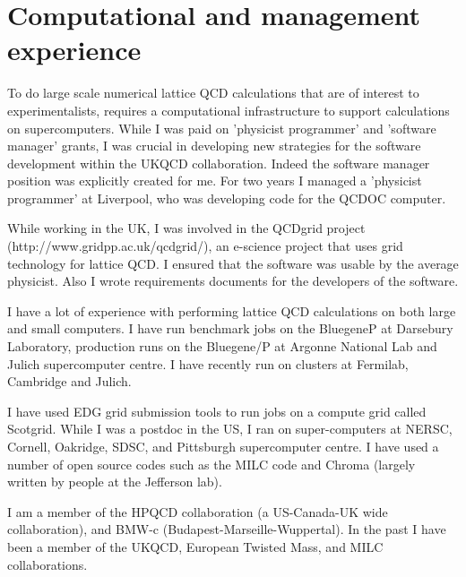 
\section{Computational and management experience}

To do large scale numerical lattice QCD calculations that are of
interest to experimentalists, requires a computational infrastructure
to support calculations on supercomputers.  While I was paid on
'physicist programmer' and 'software manager' grants, I was crucial in
developing new strategies for the software development within the 
UKQCD collaboration.
Indeed the software manager position was explicitly created for me.
For two years I managed a 'physicist programmer' at Liverpool, who
was developing code for the QCDOC computer. 

While working in the UK, I was involved in the 
QCDgrid project (http://www.gridpp.ac.uk/qcdgrid/), 
an e-science project that
uses grid technology for lattice QCD.  I ensured that the software was
usable by the average physicist. Also I wrote requirements
documents for the developers of the software.

I have a lot of experience with performing lattice QCD calculations on
both large and small computers. 
I have run benchmark jobs on the 
BluegeneP at Darsebury Laboratory, production runs on
the Bluegene/P at Argonne National Lab and Julich supercomputer centre.
I have recently run on 
clusters at Fermilab, Cambridge and Julich.

I have
used EDG grid submission tools to run jobs on a compute grid
called Scotgrid.  While I was a postdoc in the US, I ran on
super-computers at NERSC, Cornell, Oakridge, SDSC, and Pittsburgh
supercomputer centre. I have used a number of open source codes such
as the MILC code and Chroma (largely written by people at the
Jefferson lab).

I am a member of the
HPQCD collaboration (a US-Canada-UK wide collaboration),
and BMW-c (Budapest-Marseille-Wuppertal).
In the past I have been a member of the UKQCD,
European Twisted Mass,
and MILC collaborations.
